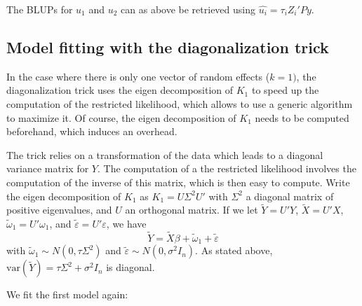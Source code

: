 \documentclass{article}
\begin{document}
  The BLUPs for $u_1$ and $u_2$ can as above be retrieved using $\widehat{u_i} = \tau_i Z_i' P y$.
  
  \subsection{Model fitting with the diagonalization trick}

  In the case where there is only one vector of random effects ($k = 1)$, the
  diagonalization trick uses the eigen decomposition of $K_1$ to speed up the 
  computation of the restricted likelihood, which allows to use a generic 
  algorithm to maximize it. Of course, the eigen decomposition of $K_1$ needs 
  to be computed beforehand, which induces an overhead. 

  The trick relies on a transformation of the data which leads to a diagonal variance matrix for $Y$. 
  The computation of a the restricted likelihood
  involves the computation of the inverse of this matrix, which is then easy to compute.
  Write the eigen decomposition of $K_1$ as $K_1 = U \Sigma^2 U'$ with $\Sigma^2$
  a diagonal matrix of positive eigenvalues, and $U$ an orthogonal matrix.
  If we let $\tilde Y = U'Y$, $\tilde X = U'X$, $\tilde \omega_1 = U' \omega_1$, and
  $\tilde\varepsilon = U' \varepsilon$, we have
  $$ \tilde Y = \tilde X\beta + \tilde \omega_1 + \tilde \varepsilon $$
  with $\tilde \omega_1 \sim N\left(0,\tau \Sigma^2\right)$ and $ \tilde\varepsilon \sim N(0,\sigma^2 I_n) $.
  As stated above, $\mathrm{var}\left(\tilde Y\right) = \tau \Sigma^2 + \sigma^2 I_n$ is diagonal.

  We fit the first model again:
 
\end{document}
